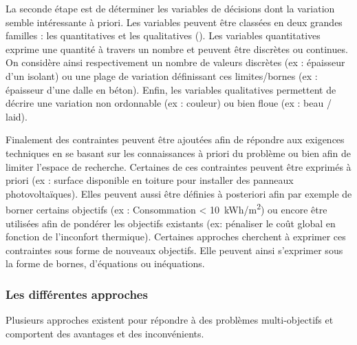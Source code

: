La seconde étape est de déterminer les variables de décisions dont la variation
semble intéressante à priori. Les variables peuvent être classées en deux grandes
familles : les quantitatives et les qualitatives ().
Les variables quantitatives exprime une quantité à travers un nombre et
peuvent être discrètes ou continues. On considère ainsi respectivement un nombre de
valeurs discrètes (ex : épaisseur d’un isolant) ou une plage de variation définissant
ces limites/bornes (ex : épaisseur d’une dalle en béton).
Enfin, les variables qualitatives permettent de décrire une variation non ordonnable
(ex : couleur) ou bien floue (ex : beau / laid).

Finalement des contraintes peuvent être ajoutées afin de répondre aux exigences
techniques en se basant sur les connaissances à priori du problème ou bien afin de
limiter l’espace de recherche.
Certaines de ces contraintes peuvent être exprimés à priori (ex : surface disponible
en toiture pour installer des panneaux photovoltaïques). Elles peuvent aussi être définies
à posteriori afin par exemple de borner certains objectifs (ex : Consommation < 10~\si{kWh/m^{2}})
ou encore être utilisées afin de pondérer les objectifs existants (ex: pénaliser le coût global en fonction de l’inconfort
thermique). Certaines approches cherchent à exprimer ces contraintes sous forme de
nouveaux objectifs.
Elle peuvent ainsi s’exprimer sous la forme de bornes, d’équations ou inéquations.


\subsubsection{Les différentes approches} %
\label{ssub:les_differentes_approches}
Plusieurs approches existent pour répondre à des problèmes multi-objectifs et
comportent des avantages et des inconvénients.

